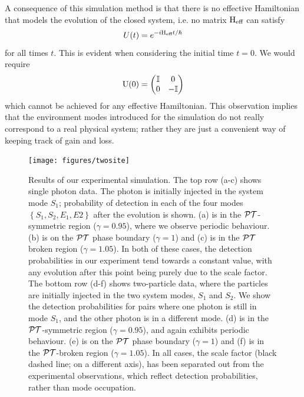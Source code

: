 A consequence of this simulation method is that there is no effective
Hamiltonian that models the evolution of the closed system, i.e. no matrix
\(\mathrm{H}_{\text{eff}}\) can satisfy
\begin{equation}
  U\!\left(t\right) = e^{-i\mathrm{H}_{\text{eff}}t/\hbar}
\end{equation}
for all times \(t\). This is evident when considering the initial time \(t=0\).
We would require
\begin{equation}
  \mathrm{U}\!\left(0\right) = \begin{pmatrix}
    \mathbb{I} & 0 \\
    0 & -\mathbb{I}
  \end{pmatrix}
\end{equation}
which cannot be achieved for any effective Hamiltonian. This observation implies
that the environment modes introduced for the simulation do not really
correspond to a real physical system; rather they are just a convenient way of
keeping track of gain and loss.

\begin{figure}[p]
  \centering
  \texttt{[image: figures/twosite]}
  \caption[Results of simulation]
    {Results of our experimental simulation. The top row (a-c) shows
    single photon data. The photon is initially injected in the system mode
    \(S_1\); probability of detection in each of the four modes \(\left\{S_1,
    S_2, E_1, E2\right\}\) after the evolution is shown. (a) is in the
    \(\mathcal{PT}{}\)-symmetric region (\(\gamma=0.95\)), where we observe periodic
    behaviour. (b) is on the \(\mathcal{PT}{}\) phase boundary (\(\gamma=1\)) and (c) is
    in the \(\mathcal{PT}{}\) broken region (\(\gamma=1.05\)). In both of these cases,
    the detection probabilities in our
    experiment tend towards a constant value, with any evolution after this
    point being purely due to the scale factor. The bottom row (d-f) shows
    two-particle data, where the particles are initially injected in the two
    system modes, \(S_1\) and \(S_2\). We show the detection probabilities for
    pairs where one photon is still in mode \(S_1\), and the other photon is in
    a different mode. (d) is in the \(\mathcal{PT}{}\)-symmetric region
    (\(\gamma=0.95\)), and again exhibits periodic behaviour. (e) is on the
    \(\mathcal{PT}{}\) phase boundary (\(\gamma=1\)) and (f) is in the \(\mathcal{PT}{}\)-broken
    region (\(\gamma=1.05\)). In all cases, the scale factor (black dashed
    line; on a different axis), has been separated out from the experimental
    observations, which reflect detection probabilities, rather than mode
    occupation.}
  \label{fig:twosite}
\end{figure}

